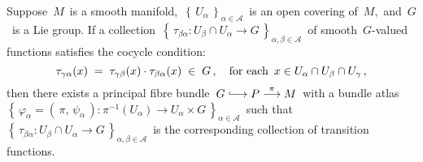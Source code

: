 
\vskip 0.5cm
\begin{proposition}
\mbox{}
\vskip 0.2cm
\noindent
Suppose \,$M$\, is a smooth manifold,
\,$\left\{\,U_{\alpha}\,\right\}_{\alpha\in\mathcal{A}}$\,
is an open covering of \,$M$,\, and
\,$G$\, is a Lie group.
If a collection
\,$\left\{\,\tau_{\beta\alpha} : U_{\beta} \cap U_{\alpha} \longrightarrow G\,\right\}_{\alpha,\beta\in\mathcal{A}}$\,
of smooth \,$G$-valued functions
satisfies the cocycle condition:
\begin{equation*}
\tau_{\gamma\alpha}(x) \; = \; \tau_{\gamma\beta}(x) \cdot \tau_{\beta\alpha}(x) \; \in \; G\,,
\quad
\textnormal{for each \,$x \in U_{\alpha} \cap U_{\beta} \cap U_{\gamma}$}\,,
\end{equation*}
then there exists a principal fibre bundle
\,$G \longhookrightarrow P \overset{\pi}{\longrightarrow} M$\,
with a bundle atlas
\,$\left\{\,\varphi_{\alpha} = (\,\pi,\,\psi_{\alpha}\,) : \pi^{-1}(U_{\alpha}) \longrightarrow U_{\alpha} \times G\,\right\}_{\alpha\in\mathcal{A}}$\,
such that
\,$\left\{\,\tau_{\beta\alpha} : U_{\beta} \cap U_{\alpha} \longrightarrow G\,\right\}_{\alpha,\beta\in\mathcal{A}}$\,
is the corresponding collection of transition functions.
\end{proposition}


